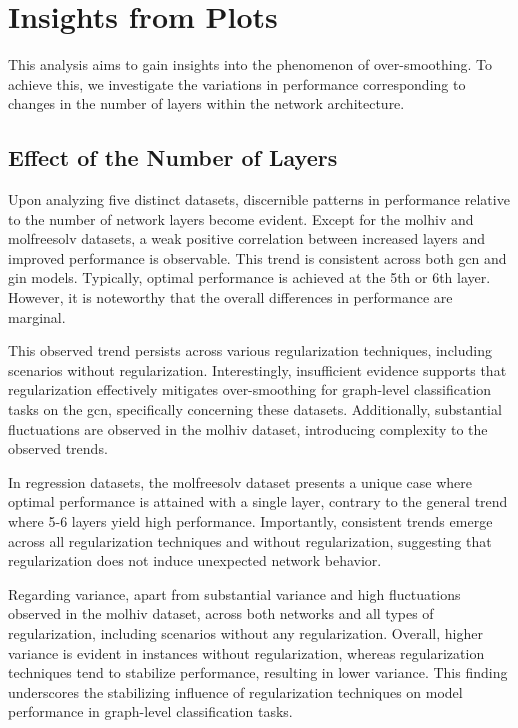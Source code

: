 \section{Insights from Plots}
This analysis aims to gain insights into the phenomenon of over-smoothing. To achieve this, we investigate the variations in performance corresponding to changes in the number of layers within the network architecture.

\subsection{Effect of the Number of Layers}

Upon analyzing five distinct datasets, discernible patterns in performance relative to the number of network layers become evident. Except for the molhiv and molfreesolv datasets, a weak positive correlation between increased layers and improved performance is observable. This trend is consistent across both \ac{gcn} and \ac{gin} models. Typically, optimal performance is achieved at the 5th or 6th layer. However, it is noteworthy that the overall differences in performance are marginal.

This observed trend persists across various regularization techniques, including scenarios without regularization. Interestingly, insufficient evidence supports that regularization effectively mitigates over-smoothing for graph-level classification tasks on the \ac{gcn}, specifically concerning these datasets. Additionally, substantial fluctuations are observed in the molhiv dataset, introducing complexity to the observed trends.

In regression datasets, the molfreesolv dataset presents a unique case where optimal performance is attained with a single layer, contrary to the general trend where 5-6 layers yield high performance. Importantly, consistent trends emerge across all regularization techniques and without regularization, suggesting that regularization does not induce unexpected network behavior.

Regarding variance, apart from substantial variance and high fluctuations observed in the molhiv dataset, across both networks and all types of regularization, including scenarios without any regularization. Overall, higher variance is evident in instances without regularization, whereas regularization techniques tend to stabilize performance, resulting in lower variance. This finding underscores the stabilizing influence of regularization techniques on model performance in graph-level classification tasks.

